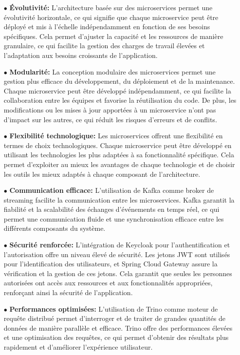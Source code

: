 \begin{enumerate}
    \item[$\bullet$] \textbf{Évolutivité:} L'architecture basée sur des microservices permet une évolutivité horizontale, ce qui signifie que chaque microservice peut être déployé et mis à l'échelle indépendamment en fonction de ses besoins spécifiques. Cela permet d'ajuster la capacité et les ressources de manière granulaire, ce qui facilite la gestion des charges de travail élevées et l'adaptation aux besoins croissants de l'application.
    \item[$\bullet$] \textbf{Modularité:} La conception modulaire des microservices permet une gestion plus efficace du développement, du déploiement et de la maintenance. Chaque microservice peut être développé indépendamment, ce qui facilite la collaboration entre les équipes et favorise la réutilisation du code. De plus, les modifications ou les mises à jour apportées à un microservice n'ont pas d'impact sur les autres, ce qui réduit les risques d'erreurs et de conflits. 
    \item[$\bullet$] \textbf{Flexibilité technologique:} Les microservices offrent une flexibilité en termes de choix technologiques. Chaque microservice peut être développé en utilisant les technologies les plus adaptées à sa fonctionnalité spécifique. Cela permet d'exploiter au mieux les avantages de chaque technologie et de choisir les outils les mieux adaptés à chaque composant de l'architecture. 
    \item[$\bullet$] \textbf{Communication efficace:} L'utilisation de Kafka comme broker de streaming facilite la communication entre les microservices. Kafka garantit la fiabilité et la scalabilité des échanges d'événements en temps réel, ce qui permet une communication fluide et une synchronisation efficace entre les différents composants du système. 
    \item[$\bullet$] \textbf{Sécurité renforcée:} L'intégration de Keycloak pour l'authentification et l'autorisation offre un niveau élevé de sécurité. Les jetons JWT sont utilisés pour l'identification des utilisateurs, et Spring Cloud Gateway assure la vérification et la gestion de ces jetons. Cela garantit que seules les personnes autorisées ont accès aux ressources et aux fonctionnalités appropriées, renforçant ainsi la sécurité de l'application.
    \item[$\bullet$] \textbf{Performances optimisées:}  L'utilisation de Trino comme moteur de requête distribué permet d'interroger et de traiter de grandes quantités de données de manière parallèle et efficace. Trino offre des performances élevées et une optimisation des requêtes, ce qui permet d'obtenir des résultats plus rapidement et d'améliorer l'expérience utilisateur. 
\end{enumerate}

